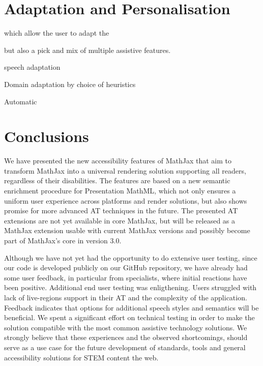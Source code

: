 \documentclass{sig-alternate}
\begin{document}
\section{Adaptation and Personalisation}
\label{sec:challenges}


which allow the user to adapt the 

but also a pick and mix of multiple assistive features.

speech adaptation

Domain adaptation by choice of heuristics

Automatic 

\section{Conclusions}
\label{sec:conc}

We have presented the new accessibility features of MathJax that aim to
transform MathJax into a universal rendering solution supporting all readers,
regardless of their disabilities. The features are based on a new semantic
enrichment procedure for Presentation MathML, which not only ensures a uniform
user experience across platforms and render solutions, but also shows promise
for more advanced AT techniques in the future. The presented AT extensions are
not yet available in core MathJax, but will be released as a MathJax extension
usable with current MathJax versions and possibly become part of MathJax's core
in version 3.0.



Although we have not yet had the opportunity to do extensive user testing, since
our code is developed publicly on our GitHub repository, we have already had
some user feedback, in particular from specialists, where initial reactions have
been positive. Additional end user testing was enligthening. Users struggled 
with lack of live-regions support in their AT and the complexity of the 
application. Feedback indicates that options for additional speech styles and 
semantics will be beneficial. 
We spent a significant effort on
technical testing in order to make the solution compatible with the most common
assistive technology solutions. 
We strongly believe that these experiences and
the observed shortcomings, should serve as a use case for the future development
of standards, tools and general accessibility solutions for STEM content the
web. 
\end{document}
